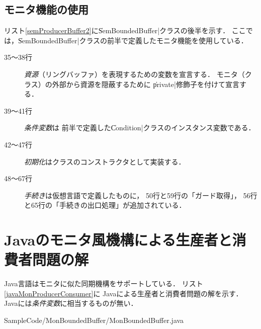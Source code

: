 \subsection{モニタ機能の使用}
リスト\ref{semProducerBuffer2}に\|SemBoundedBuffer|クラスの後半を示す．
ここでは，\|SemBoundedBuffer|クラスの前半で定義したモニタ機能を使用している．

\begin{description}
\item [35〜38行]
  \emph{資源}（リングバッファ）を表現するための変数を宣言する．
  モニタ（クラス）の外部から資源を隠蔽するために
  \|private|修飾子を付けて宣言する．
\item [39〜41行]
  \emph{条件変数}は
  前半で定義した\|Condition|クラスのインスタンス変数である．
\item [42〜47行]
  \emph{初期化}はクラスのコンストラクタとして実装する．
\item [48〜67行]
  \emph{手続き}は仮想言語で定義したものに，
  50行と59行の「ガード取得」，
  56行と65行の「手続きの出口処理」が追加されている．
\end{description}

\section{Javaのモニタ風機構による生産者と消費者問題の解}
Java言語はモニタに似た同期機構をサポートしている．
リスト\ref{javaMonProducerConsumer}に
Javaによる生産者と消費者問題の解を示す．
Javaには\emph{条件変数}に相当するものが無い．


                {SampleCode/MonBoundedBuffer/MonBoundedBuffer.java}

